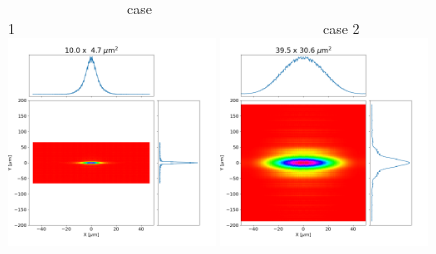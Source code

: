 \documentclass[]{article}
\begin{document}
  

\thispagestyle{empty}


\begin{figure}
    ~~~~~~~~~~~~~~~~~case 1~~~~~~~~~~~~~~~~~~~~~~~~~~~~~~~~~~~~~~~~~~~~case 2\\
    \includegraphics[width=0.49\textwidth]{figures/case1_comsyl.png}
    \includegraphics[width=0.49\textwidth]{figures/case2_comsyl.png}\\
    

\end{figure}
\end{document}
